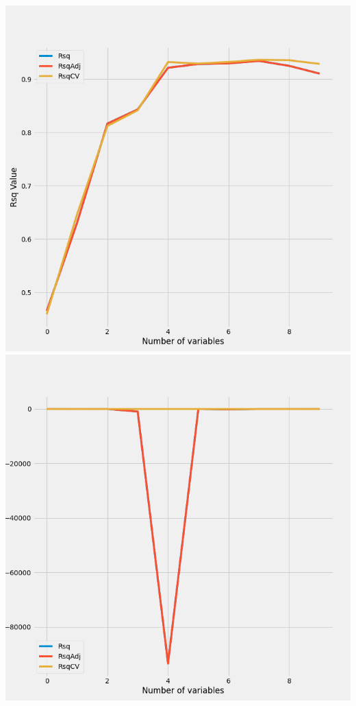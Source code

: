 \documentclass{article}
\begin{document}
	\includegraphics[scale = 0.2]{../plots/python/AutoForward3L.png} 
	\includegraphics[scale = 0.2]{../plots/python/Backward3L.png}
\end{document}
